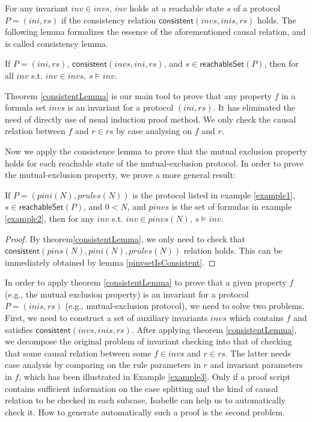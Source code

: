 \documentclass[final]{IEEEtran}
\newcommand\cai[1]{\textcolor{blue}{ #1} }
\begin{document}
{For any invariant $inv \in invs$, $inv$ holds at a reachable state $s$  of a protocol $P=(ini,rs)$  if the consistency relation
$\mathsf{consistent}( invs, inis, rs)$ holds. %
The following lemma formalizes the essence of the aforementioned causal relation, and is called consistency lemma.

\begin{theorem}\label{consistentLemma}%
 If $P=(ini,rs)$, $\mathsf{consistent}( invs, ini, rs)$, and $s  \in \mathsf{reachableSet}(P)$, %
 then   for all $inv$ s.t. $inv \in invs$, $s \models inv $.
\end{theorem}

Theorem \ref{consistentLemma} is our main tool to prove that any property $f$ in a formula set $invs$ is an invariant for a protocol $(ini,rs)$. It has eliminated the need of directly use of usual induction proof method. We only check the causal relation between $f$ and $r\in rs$ by case analysing on $f$ and $r$.

Now we apply the consistence lemma to prove that the mutual exclusion property holds for each reachable state of the mutual-exclusion protocol. %
In order to prove the mutual-exclusion property, we prove a more general result:
\begin{lemma} \label{caseSimp}
  If $ P=(pini(N),prules(N))$ is the protocol listed in example \ref{example1},  $s \in \mathsf{reachableSet}(P)$, and $0<N$, and $pinvs$ is the set of formulas in example \ref{example2},   then for any $inv$ s.t. $inv \in pinvs(N)$, $s\models inv $.
\end{lemma}

\begin{proof} By theorem\ref{consistentLemma}, we only need
to check that   $\mathsf{consistent}(pins(N),pini(N),prules(N))$ relation  holds. This can be immediately obtained by lemma \ref{pinvsetIsConsistent}. 
 \end{proof}

In order to  apply   theorem \ref{consistentLemma} to prove that a given property $f$ (e.g., the mutual exclusion property) is an invariant for a protocol $P=(inis,rs)$ (e.g., mutual-exclusion protocol), we need to solve two problems. First, we need to construct a set of auxiliary invariants $invs$ which contains $f$ and satisfies  $\mathsf{consistent}( invs, inis, rs)$.  After applying  theorem \ref{consistentLemma}, we  decompose the original problem of invariant checking into that of checking that some  causal relation between some $f\in invs$ and $r \in rs$. The latter needs case analysis by comparing on the rule parameters in $r$ and invariant parameters in $f$, which has been illustrated in Example \ref{example3}.  Only if a proof script contains sufficient information on the case splitting and  the kind of causal relation to be checked in each subcase, Isabelle can help us to automatically  check it. How to  generate automatically such a proof is the second problem.

}
\end{document}

